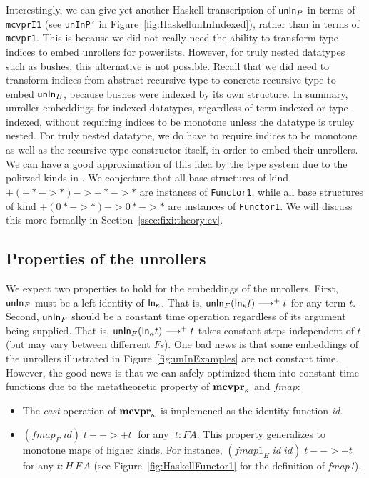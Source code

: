 Interestingly, we can give yet another
Haskell transcription of $\mathsf{unIn}_P$ in terms of \texttt{mcvprI1}
(see \texttt{unInP'} in Figure~\ref{fig:HaskellunInIndexed}),
rather than in terms of \texttt{mcvpr1}. This is because we did not
really need the ability to transform type indices to embed unrollers
for powerlists. However, for truly nested datatypes such as bushes,
this alternative is not possible. Recall that we did need to
transform indices from abstract recursive type to concrete recursive type
to embed $\mathsf{unIn}_B$, because bushes were indexed by its own structure.
In summary, unroller embeddings for indexed datatypes, regardless of
term-indexed or type-indexed, without requiring indices to be monotone
unless the datatype is truley nested. For truly nested datatype,
we do have to require indices to be monotone as well as the recursive
type constructor itself, in order to embed their unrollers. We can have
a good approximation of this idea by the type system due to the polirzed kinds
in \Fixi. We conjecture that all base structures of kind $+(+* -> *) -> +* -> *$
are instances of \texttt{Functor1}, while all base structures of kind
$+(0* -> *) -> 0* -> *$ are instances of \texttt{Functor1}. We will
discuss this more formally in Section~\ref{ssec:fixi:theory:cv}.

\subsection{Properties of the unrollers}
We expect two properties to hold for the embeddings of the unrollers.
First, $\mathsf{unIn}_F$ must be a left identity of $\mathsf{In}_\kappa$.
That is, $\mathsf{unIn}_F(\mathsf{In}_\kappa t) -->+ t$ for any term $t$.
Second, $\mathsf{unIn}_F$ should be a constant time operation regardless of its
argument being supplied. That is, $\mathsf{unIn}_F(\mathsf{In}_\kappa t) -->+ t$ takes
constant steps independent of $t$ (but may vary between differrent $F$s).
One bad news is that some embeddings of the unrollers illustrated in
Figure~\ref{fig:unInExamples} are not constant time. However, the good news is
that we can safely optimized them into constant time functions due to
the metatheoretic property of $\mathbf{mcvpr}_\kappa$ and $\textit{fmap}$:
\begin{itemize}
\item The \textit{cast} operation of $\mathbf{mcvpr}_\kappa$
	is implemened as the identity function \textit{id}.
\item $(\textit{fmap}_F\;\textit{id})\;t -->+ t\;$ for any $\;t : F A$.
	This property generalizes to monotone maps of higher kinds.
	For instance,
      $(\textit{fmap1}_H\;\textit{id}\;\textit{id})\;t -->+ t$
      for any $t : H\,F\,A$ (see Figure~\ref{fig:HaskellFunctor1}
      for the definition of \textit{fmap1}).
\end{itemize}

